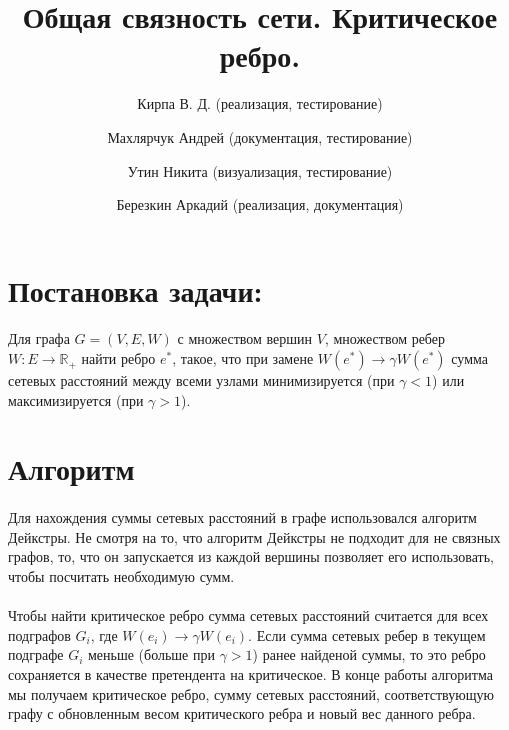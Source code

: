 \documentclass[12pt]{article}
\begin{document}
\title{Общая связность сети. Критическое ребро.}

\author{
  Кирпа В. Д. (реализация, тестирование)
  \and
  Махлярчук Андрей (документация, тестирование)
  \and
  Утин Никита (визуализация, тестирование)
  \and
  Березкин Аркадий (реализация, документация)
}

\maketitle
\thispagestyle{empty}
\newpage

\tableofcontents
\listoffigures

\newpage

\section{Постановка задачи:}

\paragraph{}
Для графа $G = (V, E, W)$ с множеством вершин $V$,
множеством ребер $W: E \rightarrow \mathbb{R}_+$
найти ребро $e^*$, такое, что при замене
$W(e^*) \rightarrow \gamma W(e^*)$ сумма сетевых 
расстояний между всеми узлами минимизируется
(при $\gamma < 1$) или максимизируется (при $\gamma > 1$).

\section{Алгоритм}

\paragraph{}
Для нахождения суммы сетевых расстояний в графе использовался
алгоритм Дейкстры\cite{dijkstra}. Не смотря на то, что алгоритм
Дейкстры не подходит для не связных графов, то, что он запускается
из каждой вершины позволяет его использовать, чтобы посчитать необходимую сумм.

\paragraph{}
Чтобы найти критическое ребро сумма сетевых расстояний считается
для всех подграфов $G_i$, где $W(e_i) \rightarrow \gamma W(e_i)$. Если сумма сетевых
ребер в текущем подграфе $G_i$ меньше (больше при $\gamma > 1$)
ранее найденой суммы, то это ребро сохраняется в качестве претендента
на критическое. В конце работы алгоритма мы получаем критическое ребро, 
сумму сетевых расстояний, соответствующую графу с обновленным весом критического ребра и новый вес данного ребра.
\end{document}
